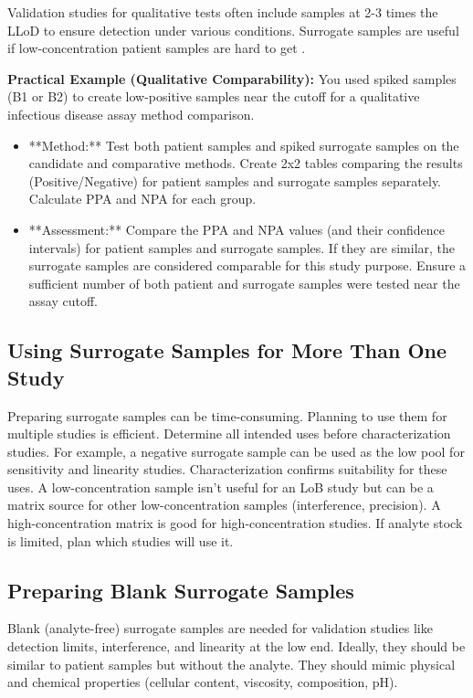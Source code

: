 \documentclass{article}
\begin{document}
Validation studies for qualitative tests often include samples at 2-3 times the LLoD to ensure detection under various conditions. Surrogate samples are useful if low-concentration patient samples are hard to get \cite{CLSIEP12}.

\textbf{Practical Example (Qualitative Comparability):}
You used spiked samples (B1 or B2) to create low-positive samples near the cutoff for a qualitative infectious disease assay method comparison.
\begin{itemize}
    \item **Method:** Test both patient samples and spiked surrogate samples on the candidate and comparative methods. Create 2x2 tables comparing the results (Positive/Negative) for patient samples and surrogate samples separately. Calculate PPA and NPA for each group.
    \item **Assessment:** Compare the PPA and NPA values (and their confidence intervals) for patient samples and surrogate samples. If they are similar, the surrogate samples are considered comparable for this study purpose. Ensure a sufficient number of both patient and surrogate samples were tested near the assay cutoff.
\end{itemize}

\subsection{Using Surrogate Samples for More Than One Study}

Preparing surrogate samples can be time-consuming. Planning to use them for multiple studies is efficient. Determine all intended uses before characterization studies. For example, a negative surrogate sample can be used as the low pool for sensitivity and linearity studies. Characterization confirms suitability for these uses. A low-concentration sample isn't useful for an LoB study but can be a matrix source for other low-concentration samples (interference, precision). A high-concentration matrix is good for high-concentration studies. If analyte stock is limited, plan which studies will use it.

\subsection{Preparing Blank Surrogate Samples}

Blank (analyte-free) surrogate samples are needed for validation studies like detection limits, interference, and linearity at the low end. Ideally, they should be similar to patient samples but without the analyte. They should mimic physical and chemical properties (cellular content, viscosity, composition, pH).
\end{document}
